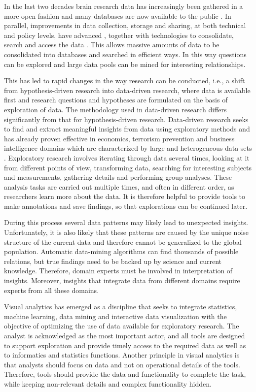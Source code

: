 \documentclass[twocolumn]{svjour3}
\begin{document}
In the last two decades brain research data has increasingly been gathered in a more open fashion and many databases are now available to the public \cite{milham_open_2012}. In parallel, improvements in data collection, storage and sharing, at both technical and policy levels, have advanced \cite{eckersley_neuroscience_2003}, together with technologies to consolidate, search and access the data \cite{van_horn_is_2009,wood_harnessing_2014}. This allows massive amounts of data to be consolidated into databases and searched in efficient ways. In this way questions can be explored and large data pools can be mined for interesting relationships.




This has led to rapid changes in the way research can be conducted, i.e., a shift from hypothesis-driven research into data-driven research, where data is available first and research questions and hypotheses are formulated on the basis of exploration of data. The methodology used in data-driven research differs significantly from that for hypothesis-driven research. Data-driven research seeks to find and extract meaningful insights from data using exploratory methods \cite{tukey_we_1980} and has already proven effective in economics, terrorism prevention and business intelligence domains which are characterized by large and heterogeneous data sets \cite{cook_illuminating_2005}. Exploratory research involves iterating through data several times, looking at it from different points of view, transforming data, searching for interesting subjects and measurements, gathering details and performing group analyses. These analysis tasks are carried out multiple times, and often in different order, as researchers learn more about the data. It is therefore helpful to provide tools to make annotations and save findings, so that explorations can be continued later.


During this process several data patterns may likely lead to unexpected insights. Unfortunately, it is also likely that these patterns are caused by the unique noise structure of the current data and therefore cannot be generalized to the global population. Automatic data-mining algorithms can find thousands of possible relations, but true findings need to be backed up by science and current knowledge.  Therefore, domain experts must be involved in interpretation of insights. Moreover, insights that integrate data from different domains require experts from all these domains.


Visual analytics \cite{keim_visual_2008} has emerged as a discipline that seeks to integrate statistics, machine learning, data mining and interactive data visualization with the objective of optimizing the use of data available for exploratory research. The analyst is acknowledged as the most important actor, and all tools are designed to support exploration and provide timely access to the required data as well as to informatics and statistics functions. Another principle in visual analytics is that analysts should focus on data and not on operational details of the tools. Therefore, tools should provide the data and functionality to complete the task, while keeping non-relevant details and complex functionality hidden.
\end{document}
